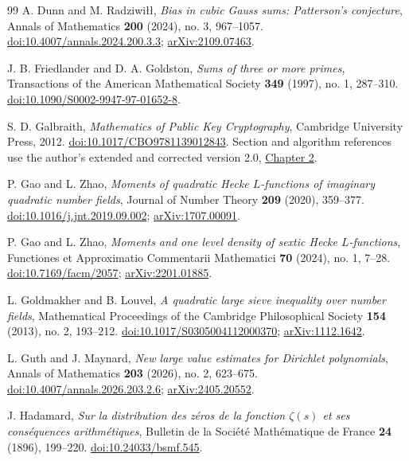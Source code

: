 \begin{thebibliography}{99}
A. Dunn and M. Radziwi\l\l,
\emph{Bias in cubic Gauss sums: Patterson's conjecture},
Annals of Mathematics \textbf{200} (2024), no. 3, 967--1057.
\href{https://doi.org/10.4007/annals.2024.200.3.3}{doi:10.4007/annals.2024.200.3.3};
\href{https://arxiv.org/abs/2109.07463}{arXiv:2109.07463}.

J. B. Friedlander and D. A. Goldston,
\emph{Sums of three or more primes},
Transactions of the American Mathematical Society \textbf{349} (1997),
no. 1, 287--310.
\href{https://doi.org/10.1090/S0002-9947-97-01652-8}{doi:10.1090/S0002-9947-97-01652-8}.

S. D. Galbraith,
\emph{Mathematics of Public Key Cryptography},
Cambridge University Press, 2012.
\href{https://doi.org/10.1017/CBO9781139012843}{doi:10.1017/CBO9781139012843}.
Section and algorithm references use the author's extended and corrected
version 2.0, \href{https://www.math.auckland.ac.nz/~sgal018/crypto-book/ch2.pdf}{Chapter 2}.

P. Gao and L. Zhao,
\emph{Moments of quadratic Hecke $L$-functions of imaginary quadratic
number fields},
Journal of Number Theory \textbf{209} (2020), 359--377.
\href{https://doi.org/10.1016/j.jnt.2019.09.002}{doi:10.1016/j.jnt.2019.09.002};
\href{https://arxiv.org/abs/1707.00091}{arXiv:1707.00091}.

P. Gao and L. Zhao,
\emph{Moments and one level density of sextic Hecke $L$-functions},
Functiones et Approximatio Commentarii Mathematici \textbf{70} (2024),
no. 1, 7--28.
\href{https://doi.org/10.7169/facm/2057}{doi:10.7169/facm/2057};
\href{https://arxiv.org/abs/2201.01885}{arXiv:2201.01885}.

L. Goldmakher and B. Louvel,
\emph{A quadratic large sieve inequality over number fields},
Mathematical Proceedings of the Cambridge Philosophical Society
\textbf{154} (2013), no. 2, 193--212.
\href{https://doi.org/10.1017/S0305004112000370}{doi:10.1017/S0305004112000370};
\href{https://arxiv.org/abs/1112.1642}{arXiv:1112.1642}.

L. Guth and J. Maynard,
\emph{New large value estimates for Dirichlet polynomials},
Annals of Mathematics \textbf{203} (2026), no. 2, 623--675.
\href{https://doi.org/10.4007/annals.2026.203.2.6}{doi:10.4007/annals.2026.203.2.6};
\href{https://arxiv.org/abs/2405.20552}{arXiv:2405.20552}.

J. Hadamard,
\emph{Sur la distribution des z\'eros de la fonction $\zeta(s)$ et ses
cons\'equences arithm\'etiques},
Bulletin de la Soci\'et\'e Math\'ematique de France \textbf{24} (1896),
199--220.
\href{https://doi.org/10.24033/bsmf.545}{doi:10.24033/bsmf.545}.


\end{thebibliography}
